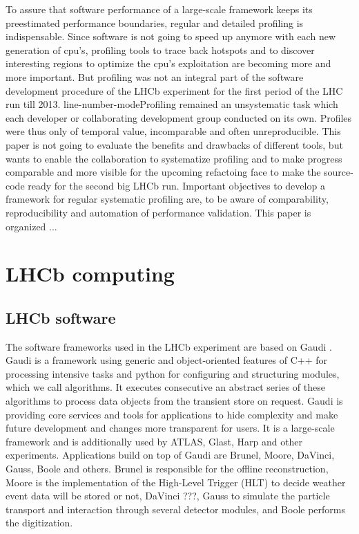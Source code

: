 \documentclass[a4paper]{jpconf}
\begin{document}
To assure that software performance of a large-scale framework keeps its preestimated performance boundaries, regular and detailed profiling is indispensable. Since software is not going to speed up anymore with each new generation of cpu's, profiling tools to trace back hotspots and to discover interesting regions to optimize the cpu's exploitation are becoming more and more important. But profiling was not an integral part of the software development procedure of the LHCb experiment for the first period of the LHC run till 2013. line-number-modeProfiling remained an unsystematic task which each developer or collaborating development group conducted on its own. Profiles were thus only of temporal value, incomparable and often unreproducible. This paper is not going to evaluate the benefits and drawbacks of different tools, but wants to enable the collaboration to systematize profiling and to make progress comparable and more visible for the upcoming refactoing face to make the source-code ready for the second big LHCb run. Important objectives to develop a framework for regular systematic profiling are, to be aware of comparability, reproducibility and automation of performance validation.
\newline
This paper is organized ...

\section{LHCb computing}
\label{sec:lhcb_computing}

\subsection{LHCb software}
\label{sec:lhcb_software}

The software frameworks used in the LHCb experiment are based on Gaudi \cite{gaudi}. Gaudi is a framework using generic and object-oriented features of C++ for processing intensive tasks and python for configuring and structuring modules, which we call algorithms. It executes consecutive an abstract series of these algorithms to process data objects from the transient store on request. Gaudi is providing core services and tools for applications to hide complexity and make future development and changes more transparent for users. It is a large-scale framework and is additionally used by ATLAS, Glast, Harp and other experiments.
\newline
Applications build on top of Gaudi are Brunel, Moore, DaVinci, Gauss, Boole and others. Brunel is responsible for the offline reconstruction, Moore is the implementation of the High-Level Trigger (HLT) to decide weather event data will be stored or not, DaVinci ???, Gauss to simulate the particle transport and interaction through several detector modules, and Boole performs the digitization.
\end{document}
